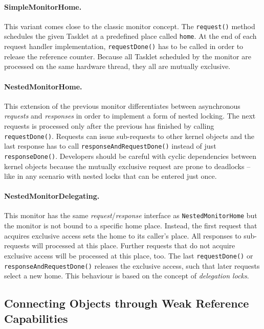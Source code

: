 \paragraph{SimpleMonitorHome.}
This variant comes close to the classic monitor concept.  The
\texttt{request()} method schedules the given Tasklet at a predefined
place called \texttt{home}.  At the end of each request handler
implementation, \texttt{requestDone()} has to be called in order to
release the reference counter.  Because all Tasklet scheduled by the
monitor are processed on the same hardware thread, they all are
mutually exclusive.

\paragraph{NestedMonitorHome.}
This extension of the previous monitor differentiates between
asynchronous \emph{requests} and \emph{responses} in order to
implement a form of nested locking.  The next requests is processed
only after the previous has finished by calling
\texttt{requestDone()}.  Requests can issue sub-requests to other
kernel objects and the last response has to call
\texttt{responseAndRequestDone()} instead of just
\texttt{responseDone()}.  Developers should be careful with cyclic
dependencies between kernel objects because the mutually exclusive
request are prone to deadlocks -- like in any scenario with nested
locks that can be entered just once.

\paragraph{NestedMonitorDelegating.}
This monitor has the same \emph{request}/\emph{response} interface as \texttt{NestedMonitorHome} but
the monitor is not bound to a specific home place.  Instead, the first
request that acquires exclusive access sets the home to its caller's
place.  All responses to sub-requests will processed at this
place.  Further requests that do not acquire exclusive access will be
processed at this place, too.  The last \texttt{requestDone()} or
\texttt{responseAndRequestDone()} releases the exclusive access, such
that later requests select a new home.  This behaviour is based on the
concept of \emph{delegation locks}.


\subsection{Connecting Objects through Weak Reference Capabilities}

